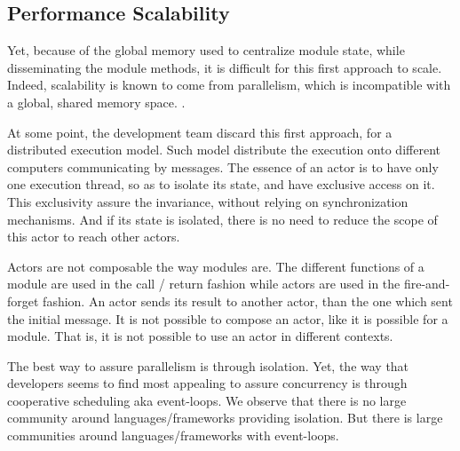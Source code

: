 \subsection{Performance Scalability}



Yet, because of the global memory used to centralize module state, while disseminating the module methods, it is difficult for this first approach to scale.
Indeed, scalability is known to come from parallelism, which is incompatible with a global, shared memory space.
.

At some point, the development team discard this first approach, for a distributed execution model.
Such model distribute the execution onto different computers communicating by messages.
The essence of an actor is to have only one execution thread, so as to isolate its state, and have exclusive access on it.
This exclusivity assure the invariance, without relying on synchronization mechanisms.
And if its state is isolated, there is no need to reduce the scope of this actor to reach other actors.

Actors are not composable the way modules are.
The different functions of a module are used in the call / return fashion while actors are used in the fire-and-forget fashion.
An actor sends its result to another actor, than the one which sent the initial message.
It is not possible to compose an actor, like it is possible for a module.
That is, it is not possible to use an actor in different contexts.


The best way to assure parallelism is through isolation.
Yet, the way that developers seems to find most appealing to assure concurrency is through cooperative scheduling aka event-loops.
We observe that there is no large community around languages/frameworks providing isolation.
But there is large communities around languages/frameworks with event-loops.

